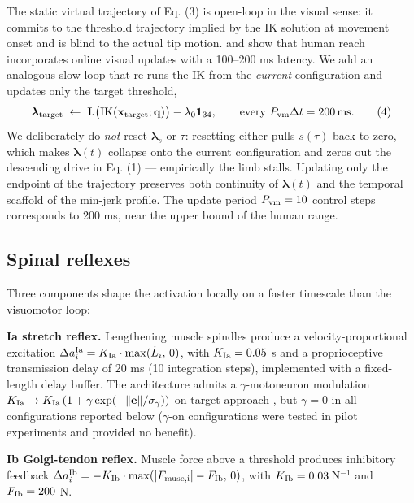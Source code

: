 \documentclass[sn-basic]{sn-jnl}
\begin{document}
The static virtual trajectory of Eq. (3) is open-loop in the visual
sense: it commits to the threshold trajectory implied by the IK solution
at movement onset and is blind to the actual tip motion. \citet{saundersknill2003} and \citet{sarlegnasainburg2009} show that human reach
incorporates online visual updates with a 100--200 ms latency. We add an
analogous slow loop that re-runs the IK from the \emph{current}
configuration and updates only the target threshold, \[
\boldsymbol{\lambda}_{\rm target} \;\leftarrow\; \mathbf{L}\bigl(\mathrm{IK}(\mathbf{x}_{\rm target};\mathbf{q})\bigr) - \lambda_{0}\mathbf{1}_{34},
\qquad \text{every } P_{\rm vm}\Delta t = 200\,\text{ms}. \tag{4}
\] We deliberately do \emph{not} reset \(\boldsymbol{\lambda}_{s}\) or
\(\tau\): resetting either pulls \(s(\tau)\) back to zero, which makes
\(\boldsymbol{\lambda}(t)\) collapse onto the current configuration and
zeros out the descending drive in Eq. (1) --- empirically the limb
stalls. Updating only the endpoint of the trajectory preserves both
continuity of \(\boldsymbol{\lambda}(t)\) and the temporal scaffold of
the min-jerk profile. The update period \(P_{\rm vm} = 10\) control
steps corresponds to 200 ms, near the upper bound of the human range.

\subsection{Spinal reflexes}

Three components shape the activation locally on a faster timescale than
the visuomotor loop:

\textbf{Ia stretch reflex.} Lengthening muscle spindles produce a
velocity-proportional excitation
\(\Delta a^{\rm Ia}_{i} = K_{\rm Ia}\cdot\max(\dot L_{i},\,0)\), with
\(K_{\rm Ia} = 0.05\) s and a proprioceptive transmission delay of 20 ms
(10 integration steps), implemented with a fixed-length delay buffer.
The architecture admits a $\gamma$-motoneuron modulation
\(K_{\rm Ia}\to K_{\rm Ia}\,(1+\gamma\exp(-\|\mathbf{e}\|/\sigma_{\gamma}))\)
on target approach \citep{prochazka1989}, but \(\gamma = 0\) in all
configurations reported below ($\gamma$-on configurations were tested in pilot
experiments and provided no benefit).

\textbf{Ib Golgi-tendon reflex.} Muscle force above a threshold produces
inhibitory feedback
\(\Delta a^{\rm Ib}_{i} = -K_{\rm Ib}\cdot\max(|F_{\rm musc, i}|-F_{\rm Ib},\,0)\),
with \(K_{\rm Ib} = 0.03\,\)N\(^{-1}\) and \(F_{\rm Ib} = 200\) N.
\end{document}
